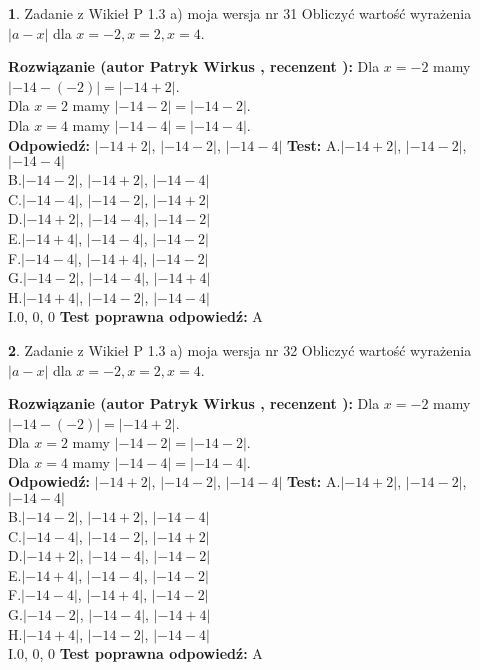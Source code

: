 \documentclass[12pt, a4paper]{article}
\theoremstyle{definition} %
\newtheorem{zad}{}
\newcommand{\zadStart}[1]{\begin{zad}#1\newline}
\newcommand{\zadStop}{\end{zad}}
\newcommand{\rozwStart}[2]{\noindent \textbf{Rozwiązanie (autor #1 , recenzent #2): }\newline}
\newcommand{\rozwStop}{\newline}
\newcommand{\odpStart}{\noindent \textbf{Odpowiedź:}\newline}
\newcommand{\odpStop}{\newline}
\newcommand{\testStart}{\noindent \textbf{Test:}\newline}
\newcommand{\testStop}{\newline}
\newcommand{\kluczStart}{\noindent \textbf{Test poprawna odpowiedź:}\newline}
\newcommand{\kluczStop}{\newline}
\begin{document}
\zadStart{Zadanie z Wikieł P 1.3 a) moja wersja nr 31}
Obliczyć wartość wyrażenia $|a - x|$ dla $x=-2,x=2,x=4$.
\zadStop
\rozwStart{Patryk Wirkus}{}
Dla $x = -2$ mamy $|-14 - (-2)| = |-14 + 2|$.\\
Dla $x = 2$ mamy $|-14 - 2| = |-14 - 2|$.\\
Dla $x = 4$ mamy $|-14 - 4| = |-14 - 4|$.\\
\rozwStop
\odpStart
$|-14 + 2|$, $|-14 - 2|$, $|-14 - 4|$
\odpStop
\testStart
A.$|-14 + 2|$, $|-14 - 2|$, $|-14 - 4|$\\
B.$|-14 - 2|$, $|-14 + 2|$, $|-14 - 4|$\\
C.$|-14 - 4|$, $|-14 - 2|$, $|-14 + 2|$\\
D.$|-14 + 2|$, $|-14 - 4|$, $|-14 - 2|$\\
E.$|-14 + 4|$, $|-14 - 4|$, $|-14 - 2|$\\
F.$|-14 - 4|$, $|-14 + 4|$, $|-14 - 2|$\\
G.$|-14 - 2|$, $|-14 - 4|$, $|-14 + 4|$\\
H.$|-14 + 4|$, $|-14 - 2|$, $|-14 - 4|$\\
I.$0$, $0$, $0$
\testStop
\kluczStart
A
\kluczStop



\zadStart{Zadanie z Wikieł P 1.3 a) moja wersja nr 32}
Obliczyć wartość wyrażenia $|a - x|$ dla $x=-2,x=2,x=4$.
\zadStop
\rozwStart{Patryk Wirkus}{}
Dla $x = -2$ mamy $|-14 - (-2)| = |-14 + 2|$.\\
Dla $x = 2$ mamy $|-14 - 2| = |-14 - 2|$.\\
Dla $x = 4$ mamy $|-14 - 4| = |-14 - 4|$.\\
\rozwStop
\odpStart
$|-14 + 2|$, $|-14 - 2|$, $|-14 - 4|$
\odpStop
\testStart
A.$|-14 + 2|$, $|-14 - 2|$, $|-14 - 4|$\\
B.$|-14 - 2|$, $|-14 + 2|$, $|-14 - 4|$\\
C.$|-14 - 4|$, $|-14 - 2|$, $|-14 + 2|$\\
D.$|-14 + 2|$, $|-14 - 4|$, $|-14 - 2|$\\
E.$|-14 + 4|$, $|-14 - 4|$, $|-14 - 2|$\\
F.$|-14 - 4|$, $|-14 + 4|$, $|-14 - 2|$\\
G.$|-14 - 2|$, $|-14 - 4|$, $|-14 + 4|$\\
H.$|-14 + 4|$, $|-14 - 2|$, $|-14 - 4|$\\
I.$0$, $0$, $0$
\testStop
\kluczStart
A
\kluczStop
\end{document}

